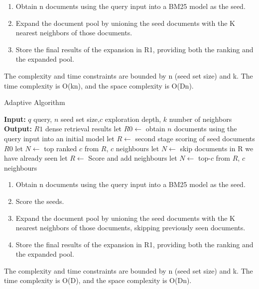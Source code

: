 \documentclass[sigconf,authorversion,nonacm]{acmart}
\begin{document}
\begin{enumerate}
	\item Obtain n documents using the query input into a BM25 model as the seed.
	\item Expand the document pool by unioning the seed documents with the K nearest neighbors of those documents.
	\item Store the final results of the expansion in R1, providing both the ranking and the expanded pool.
\end{enumerate}
The complexity and time constraints are bounded by n (seed set size) and k. The time complexity is
O(kn), and the space complexity is O(Dn).


\begin{algorithm}
	\caption{Adaptive Algorithm}
	\begin{algorithmic}[1]
		\STATE \textbf{Input:} \( q \) query, \( n \) seed set size,\( c \) exploration depth, \( k \) number of neighbors
		\STATE \textbf{Output:} \( R1 \) dense retrieval results
		\STATE let \( R0 \leftarrow \) obtain \( n \) documents using the query input into an initial model
		\STATE let \( R \leftarrow \) second stage scoring of seed documents \(R0\)
		\STATE let \( N \leftarrow\) top ranked \( c  \) from \(R \), \(c \) neighbours
		\STATE let \( N \leftarrow\) skip documents in R we have already seen
		\STATE let \( R \leftarrow \) Score and add neighbours
		\STATE let \( N \leftarrow\) top-\( c  \) from \(R \), \(c \) neighbours
		\ENDWHILE
	\end{algorithmic}
\end{algorithm}

\begin{enumerate}

	\item Obtain n documents using the query input into a BM25 model as the seed.

	\item Score the seeds.

	\item Expand the document pool by unioning the seed documents with the K nearest neighbors of
	      those documents, skipping previously seen documents.

	\item Store the final results of the expansion in R1, providing both the ranking and the
	      expanded pool.

\end{enumerate}

The complexity and time constraints are bounded by n (seed set size) and k. The time complexity is
O(D), and the space complexity is O(Dn).
\end{document}
